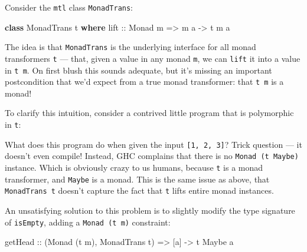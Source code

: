 \documentclass[
  11pt,
]{book}
\newenvironment{Shaded}{}{}
\newcommand{\DataTypeTok}[1]{\textcolor[rgb]{0.56,0.13,0.00}{#1}}
\newcommand{\FunctionTok}[1]{\textcolor[rgb]{0.02,0.16,0.49}{#1}}
\newcommand{\KeywordTok}[1]{\textcolor[rgb]{0.00,0.44,0.13}{\textbf{#1}}}
\newcommand{\NormalTok}[1]{#1}
\newcommand{\OperatorTok}[1]{\textcolor[rgb]{0.40,0.40,0.40}{#1}}
\newcommand{\OtherTok}[1]{\textcolor[rgb]{0.00,0.44,0.13}{#1}}
\theoremstyle{nonumberplain}
\begin{document}
Consider the \texttt{mtl} class \texttt{MonadTrans}:

\begin{Shaded}
\begin{Highlighting}[]
\KeywordTok{class} \DataTypeTok{MonadTrans}\NormalTok{ t }\KeywordTok{where}
\OtherTok{  lift ::} \DataTypeTok{Monad}\NormalTok{ m }\OtherTok{=\textgreater{}}\NormalTok{ m a }\OtherTok{{-}\textgreater{}}\NormalTok{ t m a}
\end{Highlighting}
\end{Shaded}

The idea is that \texttt{MonadTrans} is the underlying interface for all
monad transformers \texttt{t} --- that, given a value in any monad
\texttt{m}, we can \texttt{lift} it into a value in \texttt{t\ m}. On
first blush this sounds adequate, but it's missing an important
postcondition that we'd expect from a true monad transformer: that
\texttt{t\ m} is a monad!

To clarify this intuition, consider a contrived little program that is
polymorphic in \texttt{t}:

\begin{Shaded}
\end{Shaded}

What does this program do when given the input \texttt{{[}1,\ 2,\ 3{]}}?
Trick question --- it doesn't even compile! Instead, GHC complains that
there is no \texttt{Monad\ (t\ Maybe)} instance. Which is obviously
crazy to us humans, because \texttt{t} is a monad transformer, and
\texttt{Maybe} is a monad. This is the same issue as above, that
\texttt{MonadTrans\ t} doesn't capture the fact that \texttt{t} lifts
entire monad instances.

An unsatisfying solution to this problem is to slightly modify the type
signature of \texttt{isEmpty}, adding a \texttt{Monad\ (t\ m)}
constraint:

\begin{Shaded}
\begin{Highlighting}[]
\OtherTok{getHead ::}\NormalTok{ (}\DataTypeTok{Monad}\NormalTok{ (t m), }\DataTypeTok{MonadTrans}\NormalTok{ t) }\OtherTok{=\textgreater{}}\NormalTok{ [a] }\OtherTok{{-}\textgreater{}}\NormalTok{ t }\DataTypeTok{Maybe}\NormalTok{ a}
\end{Highlighting}
\end{Shaded}
\end{document}
